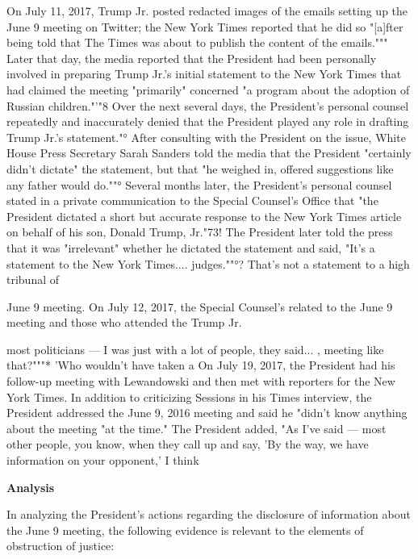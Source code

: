 On July 11, 2017, Trump Jr. posted redacted images of the emails setting up the June 9 meeting on Twitter; the New York Times reported that he did so "[a]fter being told that The Times was about to publish the content of the emails."""
Later that day, the media reported that the President had been personally involved in preparing Trump Jr.'s initial statement to the New York Times that had claimed the meeting "primarily" concerned "a program about the adoption of Russian children."'"8
Over the next several days, the President's personal counsel repeatedly and inaccurately denied that the President played any role in drafting Trump Jr.'s statement."°
After consulting with the President on the issue, White House Press Secretary Sarah Sanders told the media that the President "certainly didn't dictate" the statement, but that "he weighed in, offered suggestions like any father would do.""°
Several months later, the President's personal counsel stated in a private communication to the Special Counsel's Office that "the President dictated a short but accurate response to the New York Times article on behalf of his son, Donald Trump,
Jr."73!
The President later told the press that it was "irrelevant" whether he dictated the statement and said, "It's a statement to the New York Times.... judges.""°?
That's not a statement to a high tribunal of

June 9 meeting.
On July 12, 2017, the Special Counsel's
related to the June 9 meeting and those who attended the
Trump Jr.

most politicians — I was just with a lot of people, they said... , meeting like that?"""*
'Who wouldn't have taken a
On July 19, 2017, the President had his follow-up meeting with Lewandowski and then met with reporters for the New York Times.
In addition to criticizing Sessions in his Times interview, the President addressed the June 9, 2016 meeting and said he "didn't know anything about the meeting "at the time."
The President added, "As I've said — most other people, you know, when they call up and say, 'By the way, we have information on your opponent,' I think

\begin{center}
\textbf{Analysis}
\end{center}

In analyzing the President's actions regarding the disclosure of information about the June 9 meeting, the following evidence is relevant to the elements of obstruction of justice:

